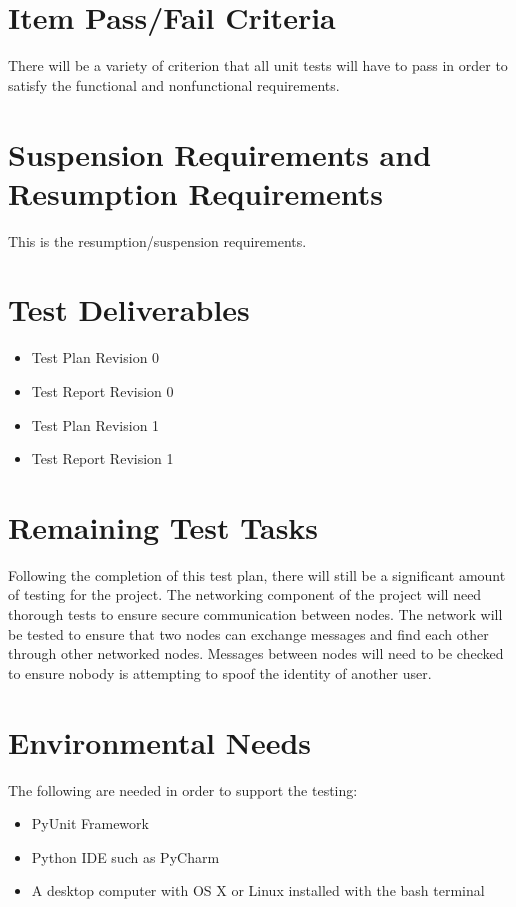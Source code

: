 \documentclass{article}
\begin{document}
\section*{Item Pass/Fail Criteria}
There will be a variety of criterion that all unit tests will have to pass in order to satisfy the functional and nonfunctional requirements.

\section*{Suspension Requirements and Resumption Requirements}
This is the resumption/suspension requirements.

\section*{Test Deliverables}
\begin{itemize}
 \item
Test Plan Revision 0
 \item
Test Report Revision 0
 \item
Test Plan Revision 1
 \item
Test Report Revision 1
\end{itemize}

\section*{Remaining Test Tasks}
Following the completion of this test plan, there will still be a significant amount of testing for the project. The networking component of the project will need thorough tests to ensure secure communication between nodes. The network will be tested to ensure that two nodes can exchange messages and find each other through other networked nodes. Messages between nodes will need to be checked to ensure nobody is attempting to spoof the identity of another user. 

\section*{Environmental Needs}
The following are needed in order to support the testing:
\newline
\begin{itemize}
 \item
PyUnit Framework
 \item
Python IDE such as PyCharm
 \item
A desktop computer with OS X or Linux installed with the bash terminal
\end{itemize}
\end{document}
